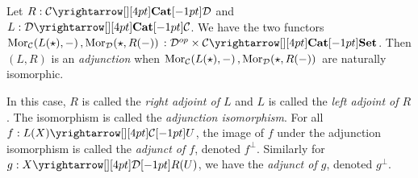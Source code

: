 \begin{dfn}[Adjunction]
  
  Let $R : \map{\CC}{\DD}{\CAT}{}$ and $L : \map{\DD}{\CC}{\CAT}{}$.
  We have the two functors 
  $\mor{L(\star)}{-}{\CC}, \mor{\star}{R(-)}{\DD} : 
  \map{\DD\op\times\CC}{\SET}{\CAT}{}$.
  Then $(L,R)$ is an \emph{adjunction} when 
  $\mathrm{Mor}_{\mathcal{C}}(L(\star), -)\,, \mathrm{Mor}_{\mathcal{D}}(\star, R(-))\,$
  are naturally isomorphic. 
  
  In this case, 
  $R$ is called the \emph{right adjoint of $L$}
  and $L$ is called the \emph{left adjoint of $R$}.
  The isomorphism is called the \emph{adjunction isomorphism}. 
  For all $f : \map{L(X)}{U}{\CC}{}$,
  the image of $f$ under the adjunction isomorphism is called 
  the \emph{adjunct of $f$}, denoted $f^\bot$. 
  Similarly for $g : \map{X}{R(U)}{\DD}{}$, 
  we have the \emph{adjunct of $g$}, denoted $g^\bot$.
\end{dfn}


